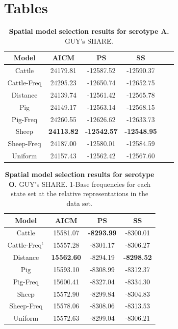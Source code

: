\documentclass[10pt]{article}
\begin{document}
\newpage
\section*{Tables}


\begin{table}[!ht]
\caption{
\textbf{Spatial model selection results for serotype A. } GUY's SHARE.}
\begin{tabular}{cccccc}
\toprule
Model & AICM  & PS    & SS\\
\midrule
Cattle	&24179.81	&-12587.52	&-12590.37\\
Cattle-Freq	&24295.23	&-12650.74	&-12652.75\\
Distance	&24139.74	&-12561.42	&-12565.78\\
Pig	&24149.17	&-12563.14	&-12568.15\\
Pig-Freq	&24260.55	&-12626.62	&-12633.73\\
Sheep	& {{ \bf 24113.82}}	& {{\bf -12542.57}}	& {{\bf -12548.95}}\\
Sheep-Freq	&24187.00	&-12580.01	&-12584.59\\
Uniform	&24157.43	&-12562.42	&-12567.60\\
\bottomrule
\end{tabular}
\begin{flushleft}
\end{flushleft}
\label{tab:predA}
 \end{table}
\begin{table}[!ht]
\caption{
\textbf{Spatial model selection results for serotype O. } GUY's SHARE. 1-Base frequencies for each state set at the relative representations in the data set. }
\begin{tabular}{cccc}
\toprule
Model	&AICM	&PS	&SS\\
\midrule
Cattle	&15581.07	&{{ \bf -8293.99}}	&-8300.01\\
Cattle-Freq$^{1}$	&15557.28	&-8301.17	&-8306.27\\ %
Distance	& {{\bf 15562.60 }}	&-8294.19	& {{ \bf -8298.52}} \\
Pig	&15593.10	&-8308.99	&-8312.37\\
Pig-Freq	&15600.41	&-8327.04	&-8334.30\\
Sheep	&15572.90	&-8299.84	&-8304.83\\
Sheep-Freq	&15578.06	&-8308.06	&-8313.53\\
Uniform	&15572.63	&-8299.04	&-8306.21\\
\bottomrule
\end{tabular}
\begin{flushleft}
\end{flushleft}
\label{tab:predO}
 \end{table}
\end{document}
